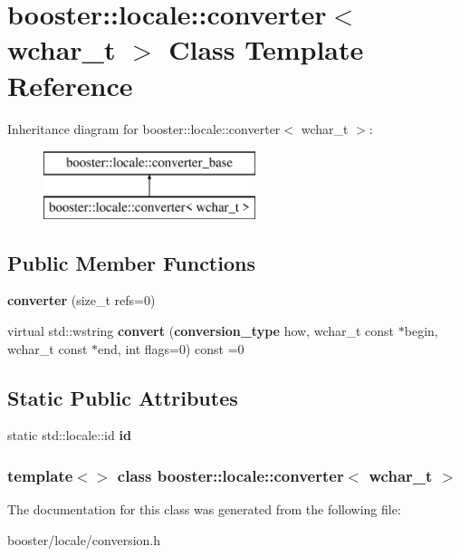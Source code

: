 \section{booster\-:\-:locale\-:\-:converter$<$ wchar\-\_\-t $>$ \-Class \-Template \-Reference}
\label{classbooster_1_1locale_1_1converter_3_01wchar__t_01_4}
\-Inheritance diagram for booster\-:\-:locale\-:\-:converter$<$ wchar\-\_\-t $>$\-:\begin{figure}[H]
\begin{center}
\leavevmode
\includegraphics[height=2.000000cm]{classbooster_1_1locale_1_1converter_3_01wchar__t_01_4}
\end{center}
\end{figure}
\subsection*{\-Public \-Member \-Functions}
\begin{DoxyCompactItemize}
\item 
{\bfseries converter} (size\-\_\-t refs=0)\label{classbooster_1_1locale_1_1converter_3_01wchar__t_01_4_aa7adfa8dc0dd7a8482d72748da609e6a}

\item 
virtual std\-::wstring {\bfseries convert} ({\bf conversion\-\_\-type} how, wchar\-\_\-t const $\ast$begin, wchar\-\_\-t const $\ast$end, int flags=0) const =0\label{classbooster_1_1locale_1_1converter_3_01wchar__t_01_4_a692b0eda1ce3dc7254ef7eb15b95bde3}

\end{DoxyCompactItemize}
\subsection*{\-Static \-Public \-Attributes}
\begin{DoxyCompactItemize}
\item 
static std\-::locale\-::id {\bfseries id}\label{classbooster_1_1locale_1_1converter_3_01wchar__t_01_4_a5f9ba76a1f6e2999f3477df7d9657bf0}

\end{DoxyCompactItemize}
\subsubsection*{template$<$$>$ class booster\-::locale\-::converter$<$ wchar\-\_\-t $>$}



\-The documentation for this class was generated from the following file\-:\begin{DoxyCompactItemize}
\item 
booster/locale/conversion.\-h\end{DoxyCompactItemize}
